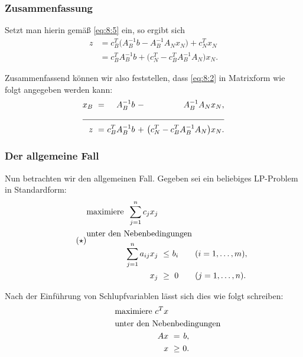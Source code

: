 \documentclass[smaller]{beamer}
\begin{document}
\begin{frame}
 \frametitle{Zusammenfassung}
 Setzt man hierin gemäß \eqref{eq:8:5} ein, so ergibt sich
\begin{equation*}
\begin{aligned}
z &= c_B^T \big( A_B^{-1}b - A_B^{-1}A_Nx_N \big) + c_N^Tx_N \\
  &= c_B^T A_B^{-1}b + \big( c_N^T - c_B^TA_B^{-1}A_N \big) x_N.
\end{aligned}
\end{equation*}

Zusammenfassend können wir also feststellen, dass \eqref{eq:8:2} in Matrixform wie folgt angegeben werden kann:
\begin{align}
\begin{alignedat}{3}
\label{eq:8:6}
x_B &\ = &\       A_B^{-1}b &\ - &\ A_B^{-1}A_Nx_N, \\ \cline{1-5}
  z &\ = &\ c_B^T A_B^{-1}b &\ + &\ \big( c_N^T - c_B^TA_B^{-1}A_N \big) x_N.
\end{alignedat}
\end{align}
\end{frame}

\begin{frame}
 \frametitle{Der allgemeine Fall}
 \alert{Nun betrachten wir den allgemeinen Fall. Gegeben sei ein beliebiges LP-Problem in Standardform}:
\begin{align}
\label{eq:8:*}
\tag{$\star$}
\begin{alignedat}{4}
& \text{maximiere } & \sum\limits_{j=1}^{n}{c_jx_j} & & & \\
& \rlap{unter den Nebenbedingungen} & & & & \\
&& \sum\limits_{j=1}^{n}{a_{ij}x_j} &\ \leq &\ b_i & \qquad (i=1,\ldots,m), \\
&&                              x_j &\ \geq &\   0 & \qquad (j=1,\ldots,n). 
\end{alignedat}
\end{align}

Nach der Einführung von Schlupfvariablen lässt sich dies wie folgt schreiben:
\begin{align*}
\begin{alignedat}{3}
& \text{maximiere } & c^Tx & & \\
& \rlap{unter den Nebenbedingungen} & & & \\
&& Ax &\    = &\ b,\ \\
&&  x &\ \geq &\ 0.\
\end{alignedat}
\end{align*}
\end{frame}
\end{document}
